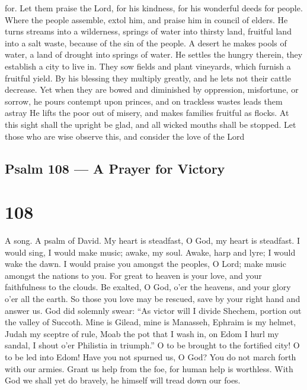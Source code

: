 for.  Let them praise the Lord, for his kindness, for his
wonderful deeds for people.  Where the people assemble,
extol him, and praise him in council of elders.  He turns
streams into a wilderness, springs of water into thirsty land,
 fruitful land into a salt waste, because of the sin of the
people.  A desert he makes pools of water, a land of
drought into springs of water.  He settles the hungry
therein, they establish a city to live in.  They sow fields
and plant vineyards, which furnish a fruitful yield.  By
his blessing they multiply greatly, and he lets not their cattle
decrease.  Yet when they are bowed and diminished by
oppression, misfortune, or sorrow,  he pours contempt upon
princes, and on trackless wastes leads them astray  He
lifts the poor out of misery, and makes families fruitful as flocks.
 At this sight shall the upright be glad, and all wicked
mouths shall be stopped.  Let those who are wise observe
this, and consider the love of the Lord

\hypertarget{psalm-108-a-prayer-for-victory}{%
\subsection{Psalm 108 --- A Prayer for
Victory}\label{psalm-108-a-prayer-for-victory}}

\hypertarget{section-107}{%
\section{108}\label{section-107}}

A song. A psalm of David.  My heart is steadfast, O God, my
heart is steadfast. I would sing, I would make music; awake, my soul.
 Awake, harp and lyre; I would wake the dawn.  I
would praise you amongst the peoples, O Lord; make music amongst the
nations to you.  For great to heaven is your love, and your
faithfulness to the clouds.  Be exalted, O God, o'er the
heavens, and your glory o'er all the earth.  So those you
love may be rescued, save by your right hand and answer us. 
God did solemnly swear: ``As victor will I divide Shechem, portion out
the valley of Succoth.  Mine is Gilead, mine is Manasseh,
Ephraim is my helmet, Judah my sceptre of rule,  Moab the
pot that I wash in, on Edom I hurl my sandal, I shout o'er Philistia in
triumph.''  O to be brought to the fortified city! O to be
led into Edom!  Have you not spurned us, O God? You do not
march forth with our armies.  Grant us help from the foe,
for human help is worthless.  With God we shall yet do
bravely, he himself will tread down our foes.

